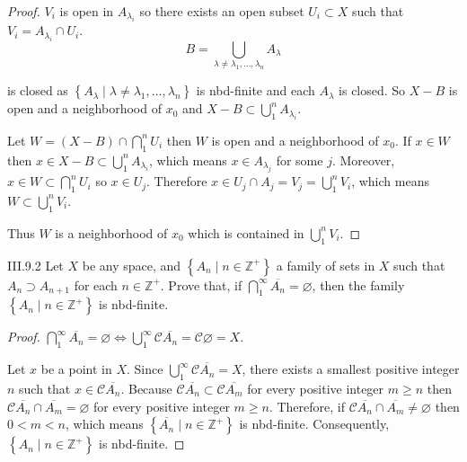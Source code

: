 \begin{proof}
    \( V_{i} \) is open in \( A_{\lambda_{i}} \) so there exists an open subset \( U_{i} \subset X \) such that \( V_{i} = A_{\lambda_{i}} \cap U_{i} \).
    \[
        B = \bigcup_{\lambda \ne \lambda_{1}, \ldots, \lambda_{n}} A_{\lambda}
    \]

    is closed as \( \left\{ A_{\lambda} \mid \lambda \ne \lambda_{1}, \ldots, \lambda_{n} \right\} \) is nbd-finite and each \( A_{\lambda} \) is closed. So \( X - B \) is open and a neighborhood of \( x_{0} \) and \( X - B \subset \bigcup^{n}_{1} A_{\lambda_{i}} \).

    Let \( W = (X - B) \cap \bigcap^{n}_{1} U_{i} \) then \( W \) is open and a neighborhood of \( x_{0} \). If \( x \in W \) then \( x \in X - B \subset \bigcup^{n}_{1} A_{\lambda_{i}} \), which means \( x \in A_{\lambda_{j}} \) for some \( j \). Moreover, \( x \in W \subset \bigcap^{n}_{1} U_{i} \) so \( x \in U_{j} \). Therefore \( x \in U_{j} \cap A_{j} = V_{j} = \bigcup^{n}_{1} V_{i} \), which means \( W \subset \bigcup^{n}_{1} V_{i} \).

    Thus \( W \) is a neighborhood of \( x_{0} \) which is contained in \( \bigcup^{n}_{1} V_{i} \).
\end{proof}

\begin{problem}{III.9.2}
Let \(X\) be any space, and \( \left\{ A_{n} \mid n \in \mathbb{Z}^{+} \right\} \) a family of sets in \(X\) such that \( A_{n} \supset A_{n+1} \) for each \( n \in \mathbb{Z}^{+} \). Prove that, if \( \bigcap^{\infty}_{1} \overline{A_{n}} = \varnothing \), then the family \( \left\{ A_{n} \mid n \in \mathbb{Z}^{+} \right\} \) is nbd-finite.
\end{problem}

\begin{proof}
    \( \bigcap^{\infty}_{1} \overline{A_{n}} = \varnothing \iff \bigcup^{\infty}_{1} \mathscr{C}\overline{A_{n}} = \mathscr{C}\varnothing = X \).

    Let \( x \) be a point in \( X \). Since \( \bigcup^{\infty}_{1} \mathscr{C}\overline{A_{n}} = X \), there exists a smallest positive integer \( n \) such that \( x \in \mathscr{C}\overline{A_{n}} \). Because \( \mathscr{C}\overline{A_{n}} \subset \mathscr{C}\overline{A_{m}} \) for every positive integer \( m \ge n \) then \( \mathscr{C}\overline{A_{n}} \cap \overline{A_{m}} = \varnothing \) for every positive integer \( m \ge n \). Therefore, if \( \mathscr{C}\overline{A_{n}} \cap \overline{A_{m}} \ne \varnothing \) then \( 0 < m < n \), which means \( \left\{ \overline{A_{n}} \mid n \in \mathbb{Z}^{+} \right\} \) is nbd-finite. Consequently, \( \left\{ A_{n} \mid n \in \mathbb{Z}^{+} \right\} \) is nbd-finite.
\end{proof}

